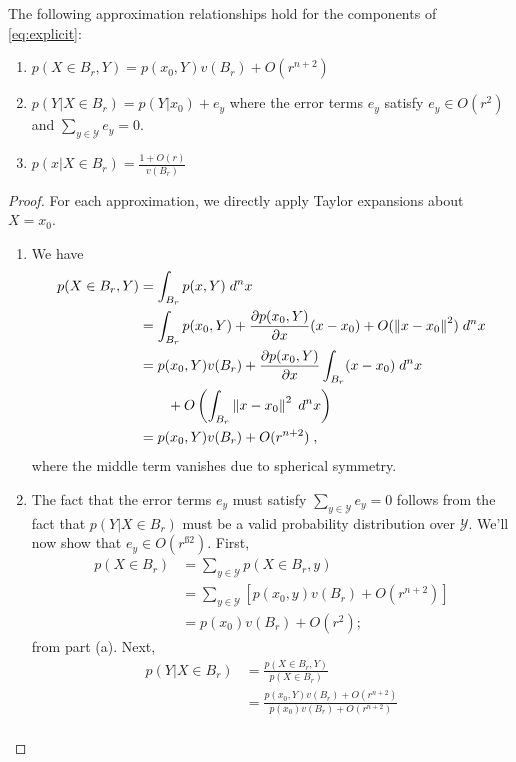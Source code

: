 	\begin{lm} \label{approximations}
		The following approximation relationships hold for the components of \eqref{eq:explicit}:
		\begin{enumerate}[label=\emph{(\alph*)}]
			\item $p(X\in B_r,Y) = p(x_0, Y) v(B_r) + O(r^{n+2})$
			\item $p(Y|X \in B_r) = p(Y|x_0) + e_y$ where the error terms $e_y$ satisfy $e_y \in O(r^{2})$ and $\sum_{y \in \mathcal{Y}} e_y = 0$. 
			\item $p(x|X \in B_r) = \frac{1 + O(r)}{v(B_r)}$
		\end{enumerate}
	\end{lm}
	\begin{proof}
		For each approximation,  we directly apply Taylor expansions about $X = x_0$. 
		\begin{enumerate}[label=(\alph*)]
			\item We have 
				\begin{align}
					p(X\in B_r, Y) &= \int_{B_r} p(x,Y) \; d^nx \\
					&= \int_{B_r} p(x_0,Y) + \frac{\partial p(x_0, Y)}{\partial x}(x - x_0) + O(\left\lVert x - x_0\right\rVert^2) \; d^nx \\
					&= p(x_0, Y)v(B_r) +  \frac{\partial p(x_0, Y)}{\partial x} \int_{B_r} (x - x_0)\; d^nx  \\
					&\quad \quad+ O\left(\int_{B_r} \left\lVert x - x_0\right\rVert^2\; d^nx\right) \\
					&= p(x_0, Y)v(B_r) + O(r^{n+2})\;,
				\end{align}
				where the middle term vanishes due to spherical symmetry. 
			\item The fact that the error terms $e_y$ must satisfy $\sum_{y \in \mathcal{Y}} e_y = 0$ follows from the fact that $p(Y|X \in B_r)$ must be a valid probability distribution over $\mathcal{Y}$. We'll now show that $e_y \in O(r^{ß2})$. First, 
				\begin{align}
					p(X \in B_r) &= \sum_{y\in \mathcal{Y}} p(X \in B_r, y)  \\
					&= \sum_{y\in \mathcal{Y}} \left[p(x_0, y)v(B_r) + O(r^{n+2}) \right] \\
					&= p(x_0)v(B_r) + O(r^{2});\,
				\end{align}
			from part (a). Next, 
				\begin{align}
					p(Y|X \in B_r) &= \frac{p(X\in B_r, Y)}{p(X \in B_r)} \\
					&= \frac{p(x_0, Y)v(B_r) + O(r^{n+2})}{p(x_0)v(B_r) + O(r^{n+2})} \\

\end{align}
\end{enumerate}
\end{proof}

